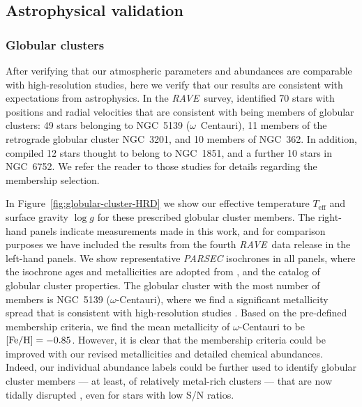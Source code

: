 \documentclass[preprint]{aastex}
\newcommand{\acronym}[1]{{\small{#1}}}
\newcommand{\project}[1]{\textsl{#1}}
\newcommand{\rave}{\project{\acronym{RAVE}}}
\newcommand{\teff}{T_{\mathrm{eff}}}
\newcommand{\logg}{\log g}
\begin{document}
\subsection{Astrophysical validation}
\label{sec:astrophysical-validation}

\subsubsection{Globular clusters}
\label{sec:globular-cluster-validation}


After verifying that our atmospheric parameters and abundances are comparable 
with high-resolution studies, here we verify that our results are consistent
with expectations from astrophysics.  In the \rave\ survey, \cite{Anguiano_2015}
identified 70 stars with positions and radial velocities that are consistent 
with being members of globular clusters: 49 stars belonging to NGC~5139
($\omega$~Centauri), 11 members of the retrograde globular cluster NGC~3201, and 10 
members of NGC~362. In addition, \citet{Kunder_2014} compiled 12 stars thought to 
belong to NGC~1851, and a further 10 stars in NGC~6752.  We refer the reader to 
those studies for details regarding the membership selection.


In Figure~\ref{fig:globular-cluster-HRD} we show our effective temperature
$\teff$ and surface gravity $\logg$ for these prescribed globular cluster members.
The right-hand panels indicate measurements made in this work, and for comparison 
purposes we have included the results from the fourth \rave\ data release in the 
left-hand panels.  We show representative \project{PARSEC} isochrones 
\citep{Bressan_2012} in all panels, where the isochrone ages and metallicities 
are adopted from \citet{Kunder_2016,Marin-Franch_2009}, and the 
\citet[][accessed 6 September 2016]{Harris_1996} catalog of globular 
cluster properties.  The globular cluster with the most number of members is 
NGC~5139 ($\omega$-Centauri), where we find a significant metallicity spread
that is consistent with high-resolution studies \citep{Marino_2011,Carretta_2009,
Carretta_2013}. Based on the pre-defined membership criteria, we find the mean 
metallicity of $\omega$-Centauri to be $[{\rm Fe/H}] = -0.85$.  However, it 
is clear that the membership criteria could be improved with our revised 
metallicities and detailed chemical abundances.  Indeed, our individual abundance
labels could be further used to identify globular cluster members --- at least, of
relatively metal-rich clusters ---  that are now tidally disrupted 
\citep{Anguiano_2016,Kuzma_2016,Navin_2016}, even for stars with low S/N ratios.
\end{document}
